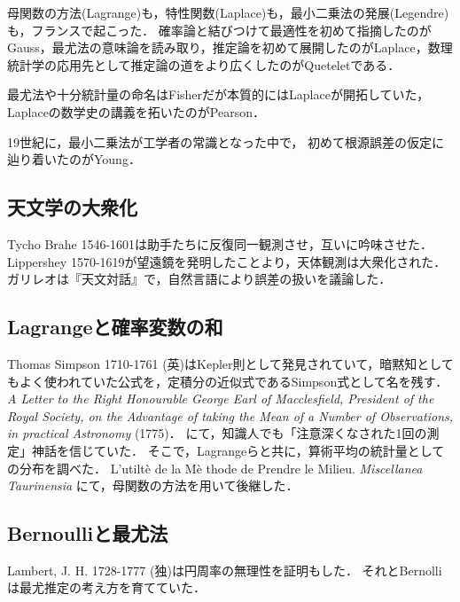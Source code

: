 \documentclass[uplatex,dvipdfmx]{jsreport}
\begin{document}
\begin{tcolorbox}[colframe=ForestGreen, colback=ForestGreen!10!white,breakable,colbacktitle=ForestGreen!40!white,coltitle=black,fonttitle=\bfseries\sffamily,
title=]
    母関数の方法(Lagrange)も，特性関数(Laplace)も，最小二乗法の発展(Legendre)も，フランスで起こった．
    確率論と結びつけて最適性を初めて指摘したのがGauss，最尤法の意味論を読み取り，推定論を初めて展開したのがLaplace，数理統計学の応用先として推定論の道をより広くしたのがQueteletである．

    最尤法や十分統計量の命名はFisherだが本質的にはLaplaceが開拓していた，Laplaceの数学史の講義を拓いたのがPearson．

    19世紀に，最小二乗法が工学者の常識となった中で，
    初めて根源誤差の仮定に辿り着いたのがYoung．
\end{tcolorbox}

\subsection{天文学の大衆化}

Tycho Brahe 1546-1601は助手たちに反復同一観測させ，互いに吟味させた．
Lippershey 1570-1619が望遠鏡を発明したことより，天体観測は大衆化された．
ガリレオは『天文対話』で，自然言語により誤差の扱いを議論した．

\subsection{Lagrangeと確率変数の和}

Thomas Simpson 1710-1761 (英)はKepler則として発見されていて，暗黙知としてもよく使われていた公式を，定積分の近似式であるSimpson式として名を残す．
\textit{A Letter to the Right Honourable George Earl of Macclesfield, President of the Royal Society, on the Advantage of taking the Mean of a Number of Observations, in practical Astronomy} (1775)．
にて，知識人でも「注意深くなされた1回の測定」神話を信じていた．
そこで，Lagrangeらと共に，算術平均の統計量としての分布を調べた．
L'utilt\`{e} de la M\`{e} thode de Prendre le Milieu.
\textit{Miscellanea Taurinensia}
にて，母関数の方法を用いて後継した．

\subsection{Bernoulliと最尤法}

Lambert, J. H. 1728-1777 (独)は円周率の無理性を証明もした．
それとBernolliは最尤推定の考え方を育てていた．
\end{document}
